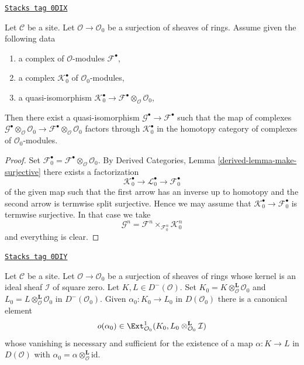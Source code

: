 \begin{lemma}
\label{defos-lemma-lift-map-complexes}
\href{https://stacks.math.columbia.edu/tag/0DIX}{\texttt{Stacks tag 0DIX}}

Let $\mathcal{C}$ be a site. Let $\mathcal{O} \to \mathcal{O}_0$
be a surjection of sheaves of rings. Assume given the following data
\begin{enumerate}
\item a complex of $\mathcal{O}$-modules $\mathcal{F}^\bullet$,
\item a complex $\mathcal{K}_0^\bullet$ of $\mathcal{O}_0$-modules,
\item a quasi-isomorphism $\mathcal{K}_0^\bullet \to
\mathcal{F}^\bullet \otimes_\mathcal{O} \mathcal{O}_0$,
\end{enumerate}
Then there exist a quasi-isomorphism
$\mathcal{G}^\bullet \to \mathcal{F}^\bullet$ such that the map
of complexes
$\mathcal{G}^\bullet  \otimes_\mathcal{O} \mathcal{O}_0 \to
\mathcal{F}^\bullet \otimes_\mathcal{O} \mathcal{O}_0$ factors
through $\mathcal{K}_0^\bullet$ in the homotopy category
of complexes of $\mathcal{O}_0$-modules.
\end{lemma}

\begin{proof}
Set $\mathcal{F}_0^\bullet =
\mathcal{F}^\bullet \otimes_\mathcal{O} \mathcal{O}_0$.
By Derived Categories, Lemma \ref{derived-lemma-make-surjective}
there exists a factorization
$$
\mathcal{K}_0^\bullet \to \mathcal{L}_0^\bullet \to \mathcal{F}_0^\bullet
$$
of the given map such that the first arrow has an inverse up
to homotopy and the second arrow is termwise split surjective.
Hence we may assume that $\mathcal{K}_0^\bullet \to \mathcal{F}_0^\bullet$
is termwise surjective.
In that case we take
$$
\mathcal{G}^n = \mathcal{F}^n \times_{\mathcal{F}^n_0} \mathcal{K}_0^n
$$
and everything is clear.
\end{proof}

\begin{lemma}
\label{defos-lemma-inf-obs-map-defo-complex}
\href{https://stacks.math.columbia.edu/tag/0DIY}{\texttt{Stacks tag 0DIY}}

Let $\mathcal{C}$ be a site. Let $\mathcal{O} \to \mathcal{O}_0$
be a surjection of sheaves of rings whose kernel is an ideal sheaf
$\mathcal{I}$ of square zero. Let $K, L \in D^-(\mathcal{O})$.
Set $K_0 = K \otimes_\mathcal{O}^\mathbf{L} \mathcal{O}_0$
and $L_0 = L \otimes_\mathcal{O}^\mathbf{L} \mathcal{O}_0$
in $D^-(\mathcal{O}_0)$. Given $\alpha_0 : K_0 \to L_0$ in $D(\mathcal{O}_0)$
there is a canonical element
$$
o(\alpha_0) \in \Ext^1_{\mathcal{O}_0}(K_0,
L_0 \otimes_{\mathcal{O}_0}^\mathbf{L} \mathcal{I})
$$
whose vanishing is necessary and sufficient for the
existence of a map $\alpha : K \to L$ in $D(\mathcal{O})$
with $\alpha_0 = \alpha \otimes_\mathcal{O}^\mathbf{L} \text{id}$.
\end{lemma}

